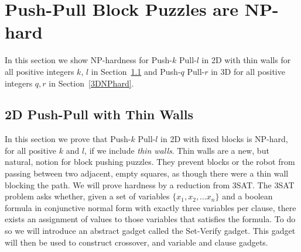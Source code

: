 
\section{Push-Pull Block Puzzles are NP-hard}
In this section we show NP-hardness for Push-$k$ Pull-$l$ in 2D with thin walls for all positive integers $k$, $l$ in Section~\ref{2DNPhard} and Push-$q$ Pull-$r$ in 3D for all positive integers $q, r$ in Section~\ref{3DNPhard}. 

 


\subsection{2D Push-Pull with Thin Walls}
\label{2DNPhard}
In this section we prove that Push-$k$ Pull-$l$ in 2D with fixed blocks is NP-hard, for all positive $k$ and $l$, if we include \emph{thin walls}. Thin walls are a new, but natural, notion for block pushing puzzles. They prevent blocks or the robot from passing between two adjacent, empty squares, as though there were a thin wall blocking the path. We will prove hardness by a reduction from 3SAT. The 3SAT problem asks whether, given a set of variables $\{x_1, x_2, \ldots x_n\}$ and a boolean formula in conjunctive normal form with exactly three variables per clause, there exists an assignment of values to those variables that satisfies the formula\cite{NPBook}. To do so we will introduce an abstract gadget called the Set-Verify gadget. This gadget will then be used to construct crossover, and variable and clause gadgets.

